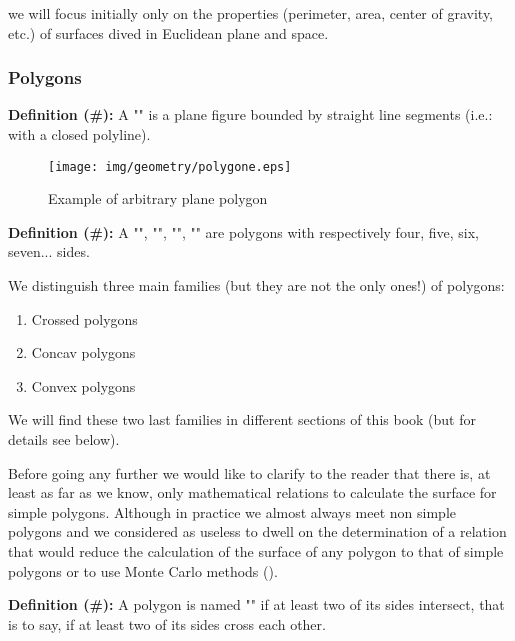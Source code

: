 {	\begin{tcolorbox}[title=Remark,colframe=black,arc=10pt]
we will focus initially only on the properties (perimeter, area, center of gravity, etc.) of surfaces dived in Euclidean plane and space.
	\end{tcolorbox}	

	\subsubsection{Polygons}
	\textbf{Definition (\#\mydef):} A "" is a plane figure bounded by straight line segments (i.e.: with a closed polyline).

\begin{figure}[H]
\centering
\texttt{[image: img/geometry/polygone.eps]}
\caption{Example of arbitrary plane polygon}
\end{figure}

\textbf{Definition (\#\mydef):} A "", "", "", "" are polygons with respectively four, five, six, seven... sides.

We distinguish three main families (but they are not the only ones!) of polygons: 
	\begin{enumerate}
		\item Crossed polygons
		\item Concav polygons
		\item Convex polygons
	\end{enumerate}
We will find these two last families in different sections of this book (but for details see below).

Before going any further we would like to clarify to the reader that there is, at least as far as we know, only mathematical relations to calculate the surface for simple polygons. Although in practice we almost always meet non simple polygons and we considered as useless to dwell on the determination of a relation that would reduce the calculation of the surface of any polygon to that of simple polygons or to use Monte Carlo methods ().

	\textbf{Definition (\#\mydef):} A polygon is named "" if at least two of its sides intersect, that is to say, if at least two of its sides cross each other. 

}
